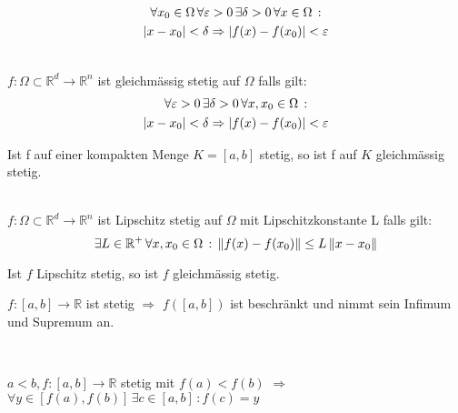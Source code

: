 \begin{multicols}{2}
\begin{theorem}
			\begin{gather*}
				\forall x_0 \in \Omega \, \forall \varepsilon > 0 \, \exists \delta > 0 \, \forall x \in \Omega\, : \\ 
				\left\vert x - x_0 \right\vert < \delta \Rightarrow \left\vert  f(x)-f(x_0)  \right\vert < \varepsilon
			\end{gather*}
		\end{theorem}
		\begin{theorem}\hfill\\
			$f: \Omega \subset \mathbb{R}^d \to \mathbb{R}^n $ ist gleichmässig stetig auf $\Omega$ falls gilt:
			\begin{gather*}
				\forall \varepsilon > 0 \, \exists \delta > 0 \, \forall x, x_0 \in \Omega\, : \\ 
				\left\vert x - x_0 \right\vert < \delta \Rightarrow \left\vert  f(x)-f(x_0)  \right\vert < \varepsilon
			\end{gather*}
		\end{theorem}
		\begin{proofhelp}
			Ist f auf einer kompakten Menge $K = \left[ a,b \right]$ stetig, so ist f auf $K$ gleichmässig stetig.
		\end{proofhelp}
		\begin{theorem}\hfill\\
			$f: \Omega \subset \mathbb{R}^d \to \mathbb{R}^n $ ist Lipschitz stetig auf $\Omega$ mit Lipschitzkonstante L falls gilt:
			$$ \exists L \in \mathbb{R}^+ \, \forall x, x_0 \in \Omega \, : \, \left\Vert  f(x)-f(x_0)  \right\Vert \leq L \left\Vert x - x_0 \right\Vert $$
		\end{theorem}
		\begin{proofhelp}
			Ist $f$ Lipschitz stetig, so ist $f$ gleichmässig stetig.
		\end{proofhelp}
		\begin{proofhelp}
			$f: \left[ a,b \right] \to \mathbb{R}$ ist stetig $\Rightarrow$ $f(\left[ a,b \right])$ ist beschränkt und nimmt sein Infimum und Supremum an.
		\end{proofhelp}
		\\[1em]
		\begin{theorem}[Zwischenwertsatz]
			\begin{center}
				$a < b, f:\left[ a, b \right] \to \mathbb{R}$ stetig mit $f(a) < f(b)$ $\Rightarrow$ $ \forall y \in \left[ f(a), f(b) \right] \, \exists c \in \left[ a, b \right] \, : f(c) = y$
			\end{center}
		\end{theorem}
		\begin{theorem}

\end{theorem}
\end{multicols}
